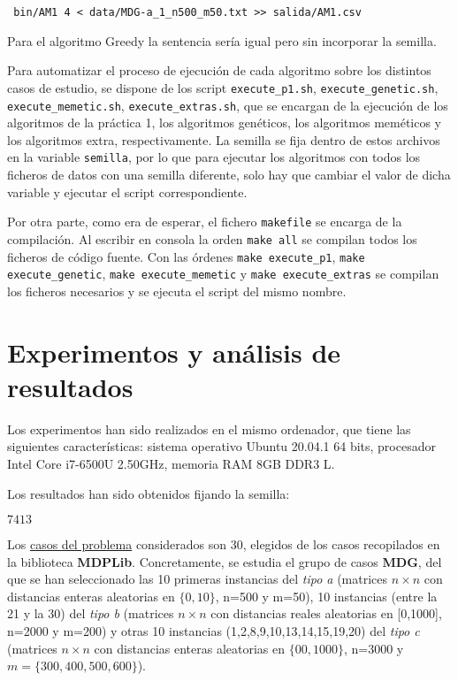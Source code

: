 \documentclass[10pt,a4paper]{article}
\begin{document}
	 \lstinline| bin/AM1 4 < data/MDG-a_1_n500_m50.txt >> salida/AM1.csv|
	
	Para el algoritmo Greedy la sentencia sería igual pero sin incorporar la semilla. 
	
	Para automatizar el proceso de ejecución de cada algoritmo sobre los distintos casos de estudio, se dispone de los script \lstinline|execute_p1.sh|, \lstinline|execute_genetic.sh|, \lstinline|execute_memetic.sh|, \lstinline|execute_extras.sh|, que se encargan de la ejecución de los algoritmos de la práctica 1, los algoritmos genéticos, los algoritmos meméticos y los algoritmos extra, respectivamente. La semilla se fija dentro de estos archivos en la variable \lstinline|semilla|, por lo que para ejecutar los algoritmos con todos los ficheros de datos con una semilla diferente, solo hay que cambiar el valor de dicha variable y ejecutar el script correspondiente. 
	
	Por otra parte, como era de esperar, el fichero \lstinline|makefile| se encarga de la compilación. Al escribir en consola la orden \lstinline|make all| se compilan todos los ficheros de código fuente. Con las órdenes \lstinline|make execute_p1|, \lstinline|make execute_genetic|, \lstinline|make execute_memetic| y  \lstinline|make execute_extras| se compilan los ficheros necesarios y se ejecuta el script del mismo nombre. 
	
	\section{Experimentos y análisis de resultados}
	
	Los experimentos han sido realizados en el mismo ordenador, que tiene las siguientes características: sistema operativo Ubuntu 20.04.1 64 bits, procesador Intel Core i7-6500U 2.50GHz, memoria RAM 8GB DDR3 L.
	
	Los resultados han sido obtenidos fijando la semilla:
	\vspace{-5mm} \begin{center}{ $ 7413 $}\end{center}
 \vspace{-4mm}
	
	Los \underline{casos del problema} considerados son 30, elegidos de los casos recopilados en la biblioteca \textbf{MDPLib}. Concretamente, se estudia el grupo de casos \textbf{MDG}, del que se han seleccionado las 10 primeras instancias del \textit{tipo a} (matrices $n\times n$ con distancias enteras aleatorias en $ \{0,10\} $, n=500 y m=50), 10 instancias (entre la 21 y la 30) del \textit{tipo b} (matrices $n\times n$ con distancias reales aleatorias en [0,1000], n=2000 y m=200) y otras 10 instancias (1,2,8,9,10,13,14,15,19,20) del \textit{tipo c} (matrices $n\times n$ con distancias enteras aleatorias en $ \{00,1000\} $, n=3000 y\\ $ m=\{300,400,500,600\} $).
	
\end{document}
